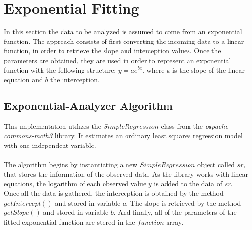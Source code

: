 \newpage




\section{Exponential Fitting}
In this section the data to be analyzed is assumed to come from an exponential function. 
%
The approach consists of first converting the incoming data to a linear function, in order to retrieve the slope and interception values. 
%
Once the parameters are obtained, they are used in order to represent an exponential function with the following structure: $y = ae^{bx}$, where $a$ is the slope of the linear equation and $b$ the interception. 

\subsection{Exponential-Analyzer Algorithm}
This implementation utilizes the $SimpleRegression$ class from the \textit{oapache-commons-math3} library. It estimates an ordinary least squares regression model with one independent variable. 
%
\\
\\
The algorithm begins by instantiating a new $SimpleRegression$ object called $sr$, that stores the information of the observed data.
%
As the library works with linear equations, the logarithm of each observed value $y$ is added to the data of  $sr$. 
%
Once all the data is gathered, the interception is obtained by the method $getIntercept()$ and stored in variable $a$. 
%
The slope is retrieved by the method $getSlope()$ and stored in variable $b$. 
%
And finally, all of the parameters of the fitted exponential function are stored in the $function$ array.

